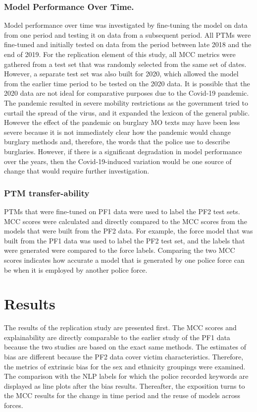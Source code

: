 \subsubsection{Model Performance Over Time.} Model performance over time was investigated by fine-tuning the model on data from one period and testing it on data from a subsequent period. All PTMs were fine-tuned and initially tested on data from the period between late 2018 and the end of 2019. For the replication element of this study, all MCC metrics were gathered from a test set that was randomly selected from the same set of dates. However, a separate test set was also built for 2020, which allowed the model from the earlier time period to be tested on the 2020 data. It is possible that the 2020 data are not ideal for comparative purposes due to the Covid-19 pandemic. The pandemic resulted in severe mobility restrictions as the government tried to curtail the spread of the virus, and it expanded the lexicon of the general public. However the effect of the pandemic on burglary MO texts may have been less severe because it is not immediately clear how the pandemic would change burglary methods and, therefore, the words that the police use to describe burglaries. However, if there is a significant degradation in model performance over the years, then the Covid-19-induced variation would be one source of change that would require further investigation.   

\subsubsection{PTM transfer-ability} PTMs that were fine-tuned on PF1 data were used to label the PF2 test sets. MCC scores were calculated and directly compared to the MCC scores from the models that were built from the PF2 data. For example, the force model that was built from the PF1 data was used to label the PF2 test set, and the labels that were generated were compared to the force labels. Comparing the two MCC scores indicates how accurate a model that is generated by one police force can be when it is employed by another police force.

\section{Results} The results of the replication study are presented first. The MCC scores and explainability are directly comparable to the earlier study of the PF1 data because the two studies are based on the exact same methods. The estimates of bias are different because the PF2 data cover victim characteristics. Therefore, the metrics of extrinsic bias for the sex and ethnicity groupings were examined. The comparison with the NLP labels for which the police recorded keywords are displayed as line plots after the bias results. Thereafter, the exposition turns to the MCC results for the change in time period and the reuse of models across forces.

